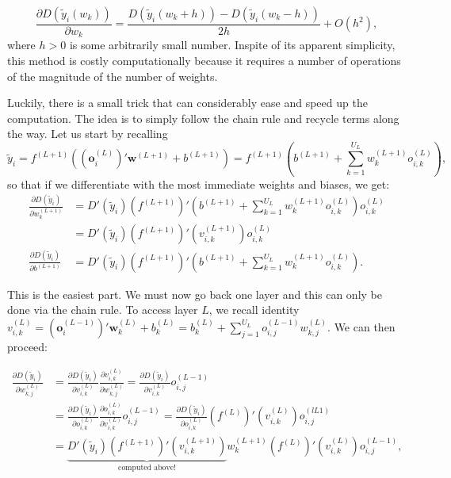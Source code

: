 \documentclass[]{krantz}
\theoremstyle{definition}
\theoremstyle{definition}
\theoremstyle{definition}
\theoremstyle{remark}
\begin{document}
\[\frac{\partial D(\tilde{y}_i(w_k))}{\partial w_k} = \frac{D(\tilde{y}_i(w_k+h))-D(\tilde{y}_i(w_k-h))}{2h}+O(h^2),\]
where \(h>0\) is some arbitrarily small number. Inspite of its apparent
simplicity, this method is costly computationally because it requires a
number of operations of the magnitude of the number of weights.

Luckily, there is a small trick that can considerably ease and speed up
the computation. The idea is to simply follow the chain rule and recycle
terms along the way. Let us start by recalling
\[\tilde{y}_i =f^{(L+1)} \left((\textbf{o}^{(L)}_i)'\textbf{w}^{(L+1)}+b^{(L+1)}\right)=f^{(L+1)}\left(b^{(L+1)}+\sum_{k=1}^{U_L} w^{(L+1)}_ko^{(L)}_{i,k} \right),\]
so that if we differentiate with the most immediate weights and biases,
we get: \begin{align}
\frac{\partial D(\tilde{y}_i)}{\partial w_k^{(L+1)}}&=D'(\tilde{y}_i) \left(f^{(L+1)} \right)'\left( b^{(L+1)}+\sum_{k=1}^{U_L} w^{(L+1)}_ko^{(L)}_{i,k}  \right)o^{(L)}_{i,k} \\   \label{eq:backprop1}
&= D'(\tilde{y}_i) \left(f^{(L+1)} \right)'\left( v^{(L+1)}_{i,k}  \right)o^{(L)}_{i,k} \\
\frac{\partial D(\tilde{y}_i)}{\partial b^{(L+1)}}&=D'(\tilde{y}_i) \left(f^{(L+1)} \right)'\left( b^{(L+1)}+\sum_{k=1}^{U_L} w^{(L+1)}_ko^{(L)}_{i,k}  \right). 
\end{align}

This is the easiest part. We must now go back one layer and this can
only be done via the chain rule. To access layer \(L\), we recall
identity
\(v_{i,k}^{(L)}=(\textbf{o}^{(L-1)}_i)'\textbf{w}^{(L)}_k+b_k^{(L)}=b_k^{(L)}+\sum_{j=1}^{U_L}o^{(L-1)}_{i,j}w^{(L)}_{k,j}\).
We can then proceed:

\begin{align}
\frac{\partial D(\tilde{y}_i)}{\partial w_{k,j}^{(L)}}&=\frac{\partial D(\tilde{y}_i)}{\partial v^{(L)}_{i,k}}\frac{\partial v^{(L)}_{i,k}}{\partial w_{k,j}^{(L)}} = \frac{\partial D(\tilde{y}_i)}{\partial v^{(L)}_{i,k}}o^{(L-1)}_{i,j}\\
&=\frac{\partial D(\tilde{y}_i)}{\partial o^{(L)}_{i,k}} \frac{\partial o^{(L)}_{i,k} }{\partial v^{(L)}_{i,k}}  o^{(L-1)}_{i,j} = \frac{\partial D(\tilde{y}_i)}{\partial o^{(L)}_{i,k}}  (f^{(L)})'(v_{i,k}^{(L)})  o^{(lL1)}_{i,j} \\
&=\underbrace{D'(\tilde{y}_i) \left(f^{(L+1)} \right)'\left(v^{(L+1)}_{i,k}  \right)}_{\text{computed above!}} w^{(L+1)}_k (f^{(L)})'(v_{i,k}^{(L)})  o^{(L-1)}_{i,j},
\end{align}
\end{document}
